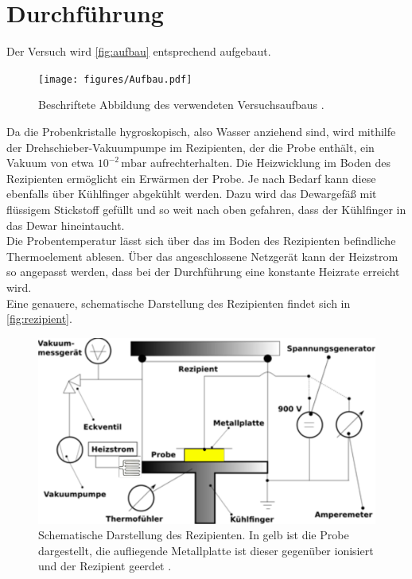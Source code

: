 \section{Durchführung}
\label{sec:Durchführung}

Der Versuch wird \autoref{fig:aufbau} entsprechend aufgebaut.

\begin{figure}[H]
    \centering
    \texttt{[image: figures/Aufbau.pdf]}
    \caption{Beschriftete Abbildung des verwendeten Versuchsaufbaus \cite{v48}.}
    \label{fig:aufbau}
\end{figure}

Da die Probenkristalle hygroskopisch, also Wasser anziehend sind, wird mithilfe der Drehschieber-Vakuumpumpe im Rezipienten, der die Probe enthält, ein Vakuum von etwa $10^{-2} \,\si{\milli\bar}$ aufrechterhalten. 
Die Heizwicklung im Boden des Rezipienten ermöglicht ein Erwärmen der Probe.
Je nach Bedarf kann diese ebenfalls über Kühlfinger abgekühlt werden. Dazu wird das Dewargefäß mit flüssigem Stickstoff gefüllt und so weit nach oben gefahren, dass der Kühlfinger in das Dewar hineintaucht. \\
Die Probentemperatur lässt sich über das im Boden des Rezipienten befindliche Thermoelement ablesen.
Über das angeschlossene Netzgerät kann der Heizstrom so angepasst werden, dass bei der Durchführung eine konstante Heizrate erreicht wird. \\
Eine genauere, schematische Darstellung des Rezipienten findet sich in \autoref{fig:rezipient}.

\begin{figure}[H]
    \centering
    \includegraphics[width=\textwidth]{figures/Rezipient.pdf}
    \caption{Schematische Darstellung des Rezipienten. In gelb ist die Probe dargestellt, die aufliegende Metallplatte ist dieser gegenüber ionisiert und der Rezipient geerdet \cite{v48}.}
    \label{fig:rezipient}
\end{figure}

